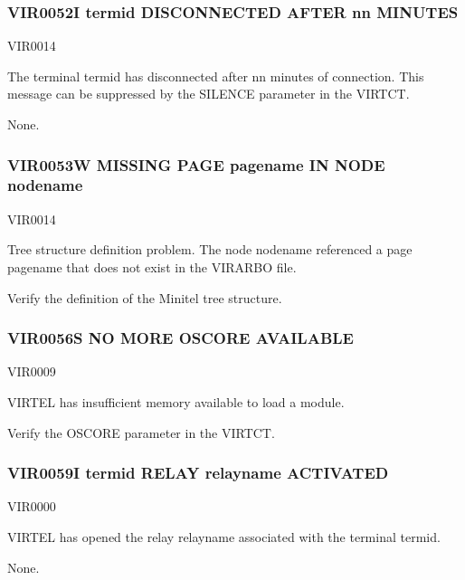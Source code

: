 \documentclass[letterpaper,10pt,english]{sphinxmanual}
\begin{document}
\subsubsection{VIR0052I termid DISCONNECTED AFTER nn MINUTES}
\label{\detokenize{messages:vir0052i-termid-disconnected-after-nn-minutes}}\begin{description}
\sphinxAtStartPar
VIR0014

\sphinxAtStartPar
The terminal termid has disconnected after nn minutes of connection. This message can be suppressed by the SILENCE parameter in the VIRTCT.

\sphinxAtStartPar
None.

\end{description}


\subsubsection{VIR0053W MISSING PAGE pagename IN NODE nodename}
\label{\detokenize{messages:vir0053w-missing-page-pagename-in-node-nodename}}\begin{description}
\sphinxAtStartPar
VIR0014

\sphinxAtStartPar
Tree structure definition problem. The node nodename referenced a page pagename that does not exist in the VIRARBO file.

\sphinxAtStartPar
Verify the definition of the Minitel tree structure.

\end{description}


\subsubsection{VIR0056S NO MORE OSCORE AVAILABLE}
\label{\detokenize{messages:vir0056s-no-more-oscore-available}}\begin{description}
\sphinxAtStartPar
VIR0009

\sphinxAtStartPar
VIRTEL has insufficient memory available to load a module.

\sphinxAtStartPar
Verify the OSCORE parameter in the VIRTCT.

\end{description}


\subsubsection{VIR0059I termid RELAY relayname ACTIVATED}
\label{\detokenize{messages:vir0059i-termid-relay-relayname-activated}}\begin{description}
\sphinxAtStartPar
VIR0000

\sphinxAtStartPar
VIRTEL has opened the relay relayname associated with the terminal termid.

\sphinxAtStartPar
None.

\end{description}
\end{document}
